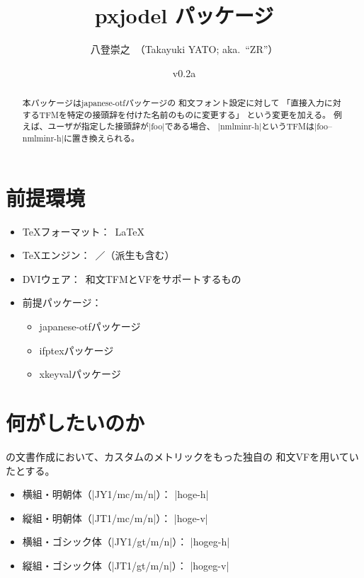 \documentclass[uplatex,dvipdfmx,a4paper]{jsarticle}
\newcommand{\PkgVersion}{0.2a}
\newcommand{\PkgDate}{2019/02/12}
\newcommand{\Pkg}[1]{\textsf{#1}}
\newcommand{\Means}{：\ }
\begin{document}
\title{\Pkg{pxjodel} パッケージ}
\author{八登崇之\ （Takayuki YATO; aka.~``ZR''）}
\date{v\PkgVersion\quad[\PkgDate]}
\maketitle

\begin{abstract}
本パッケージは\Pkg{japanese-otf}パッケージの
和文フォント設定に対して
「直接入力に対するTFMを特定の接頭辞を付けた名前のものに変更する」
という変更を加える。
例えば、ユーザが指定した接頭辞が|foo|である場合、
|nmlminr-h|というTFMは|foo--nmlminr-h|に置き換えられる。
\end{abstract}


\section{前提環境}
\label{sec:Requirement}

\begin{itemize}
\item {\TeX}フォーマット\Means {\LaTeX}
\item {\TeX}エンジン\Means {\pTeX}／{\upTeX}（派生も含む）
\item DVIウェア\Means 和文TFMとVFをサポートするもの
\item 前提パッケージ\Means
  \begin{itemize}
  \item \Pkg{japanese-otf}パッケージ
  \item \Pkg{ifptex}パッケージ
  \item \Pkg{xkeyval}パッケージ
  \end{itemize}
\end{itemize}

\section{何がしたいのか}
\label{sec:Objective}

{\pLaTeX}の文書作成において、カスタムのメトリックをもった独自の
和文VFを用いていたとする。

\begin{itemize}
\item 横組・明朝体（|JY1/mc/m/n|）： |hoge-h|
\item 縦組・明朝体（|JT1/mc/m/n|）： |hoge-v|
\item 横組・ゴシック体（|JY1/gt/m/n|）： |hogeg-h|
\item 縦組・ゴシック体（|JT1/gt/m/n|）： |hogeg-v|
\end{itemize}
\end{document}
